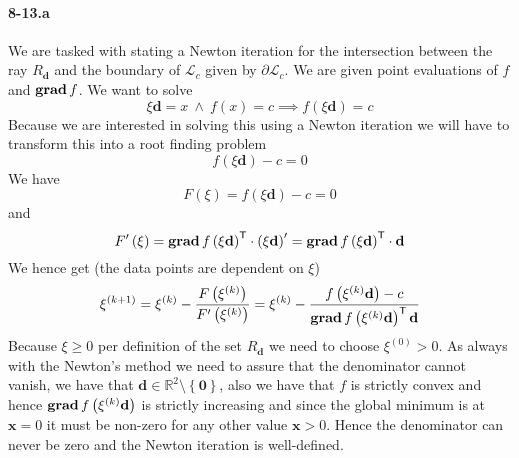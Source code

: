 \documentclass{article}
\begin{document}
\paragraph{8-13.a} We are tasked with stating a Newton iteration for the intersection between the ray $R_{\mathbf{d}}$ and the boundary of $\mathcal{L}_{c}$ given by $\partial\mathcal{L}_{c}$. We are given point evaluations of $f$ and $\text{\textbf{grad}}\, f$. We want to solve
\begin{equation*}
    \xi \mathbf{d} = x \: \land \: f\left(x\right) = c \implies f\left(\xi \mathbf{d}\right) = c
\end{equation*}
Because we are interested in solving this using a Newton iteration we will have to transform this into a root finding problem
\begin{equation*}
    f\left(\xi \mathbf{d}\right) - c = 0
\end{equation*}
We have
\begin{equation*}
    F\left(\xi\right) = f\left(\xi \mathbf{d}\right) - c = 0
\end{equation*}
and
\begin{equation*}
    F'\left(\xi\right) = \text{\textbf{grad}}\, f\left(\xi\mathbf{d}\right)^{\mathsf{T}} \cdot \left(\xi \mathbf{d}\right)' = \text{\textbf{grad}}\, f\left(\xi\mathbf{d}\right)^{\mathsf{T}} \cdot \mathbf{d}
\end{equation*}
We hence get (the data points are dependent on $\xi$)
\begin{equation*}
    \xi^{\left(k+1\right)} = \xi^{\left(k\right)} - \frac{F\left(\xi^{\left(k\right)}\right)}{F'\left(\xi^{\left(k\right)}\right)} = \xi^{\left(k\right)} - \frac{f\left(\xi^{\left(k\right)}\mathbf{d}\right)-c}{\text{\textbf{grad}}\, f\left(\xi^{\left(k\right)}\mathbf{d}\right)^{\mathsf{T}}\mathbf{d}}
\end{equation*}
Because $\xi \geq 0$ per definition of the set $R_{\mathbf{d}}$ we need to choose $\xi^{\left(0\right)} > 0$. As always with the Newton's method we need to assure that the denominator cannot vanish, we have that $\mathbf{d} \in \mathbb{R}^{2} \setminus \left\{\mathbf{0}\right\}$, also we have that $f$ is strictly convex and hence $\text{\textbf{grad}}\, f\left(\xi^{\left(k\right)}\mathbf{d}\right)$ is strictly increasing and since the global minimum is at $\mathbf{x} = 0$ it must be non-zero for any other value $\mathbf{x} > 0$. Hence the denominator can never be zero and the Newton iteration is well-defined. 
\end{document}
